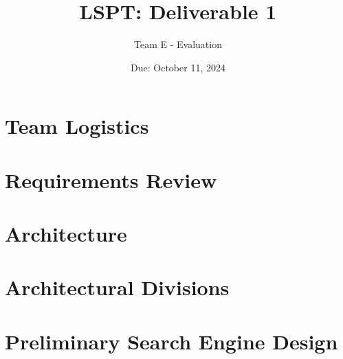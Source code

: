 \documentclass{article}
\title{LSPT: Deliverable 1}
\author{Team E - Evaluation}
\date{Due: October 11, 2024}
\begin{document}
  \maketitle
  \section*{Team Logistics}
  

  \section*{Requirements Review}
  

  \section*{Architecture}
  
  
  \section*{Architectural Divisions}
  

  \section*{Preliminary Search Engine Design}
  
\end{document}
